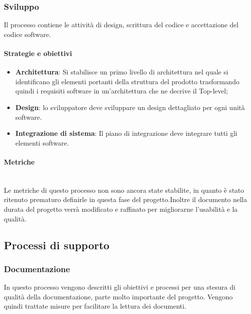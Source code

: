     \newpage  
    
    \subsubsection{Sviluppo}
    Il processo contiene le attività di design, scrittura del codice e accettazione del codice software.
    
        \paragraph{Strategie e obiettivi}
        \begin{itemize}
            \item \textbf{Architettura}: Si stabilisce un primo livello di architettura nel quale si identificano gli elementi portanti della struttura del prodotto trasformando quindi i requisiti software in un'architettura che ne decrive il Top-level;
            \item \textbf{Design}: lo sviluppatore deve sviluppare un design dettagliato per ogni unità software.
            \item \textbf{Integrazione di sistema}: Il piano di integrazione deve integrare tutti gli elementi software.
        \end{itemize}
        
        \paragraph{Metriche}
        \phantom{} \\
        Le metriche di questo processo non sono ancora state stabilite, in quanto è stato ritenuto prematuro definirle in questa fase del progetto.Inoltre il documento nella durata del progetto verrà modificato e raffinato per migliorarne l'usabilità e la qualità.
        
        
        
        \subsection{Processi di supporto}
            \subsubsection{Documentazione}
            In questo processo vengono descritti gli obiettivi e processi per una stesura di qualità della documentazione, parte molto importante del progetto. Vengono quindi trattate misure per facilitare la lettura dei documenti.
            
